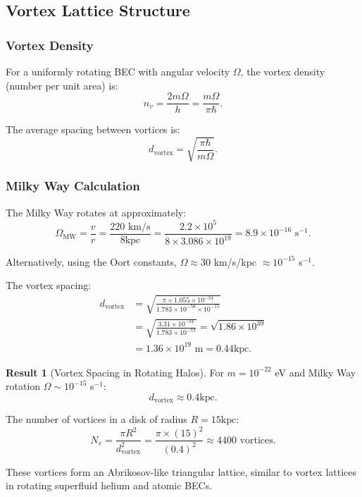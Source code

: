 \documentclass[11pt,a4paper]{article}
\newcommand{\kpc}{\ensuremath{\mathrm{kpc}}}
\theoremstyle{definition}
\newtheorem{result}{Result}[section]
\theoremstyle{remark}
\begin{document}
\subsection{Vortex Lattice Structure}
\label{sec:vortex_lattice}

\subsubsection{Vortex Density}

For a uniformly rotating BEC with angular velocity $\Omega$, the vortex density (number per unit area) is:
\begin{equation}
n_v = \frac{2m\Omega}{h} = \frac{m\Omega}{\pi\hbar}.
\end{equation}

The average spacing between vortices is:
\begin{equation}
\label{eq:vortex_spacing}
\boxed{d_{\mathrm{vortex}} = \sqrt{\frac{\pi\hbar}{m\Omega}}.}
\end{equation}

\subsubsection{Milky Way Calculation}

The Milky Way rotates at approximately:
\begin{equation}
\Omega_{\mathrm{MW}} = \frac{v}{r} = \frac{220 \text{ km/s}}{8 \kpc} = \frac{2.2 \times 10^5}{8 \times 3.086 \times 10^{19}} = 8.9 \times 10^{-16} \text{ s}^{-1}.
\end{equation}

Alternatively, using the Oort constants, $\Omega \approx 30$ km/s/kpc $\approx 10^{-15}$ s$^{-1}$.

The vortex spacing:
\begin{align}
d_{\mathrm{vortex}} &= \sqrt{\frac{\pi \times 1.055 \times 10^{-34}}{1.783 \times 10^{-58} \times 10^{-15}}} \\
&= \sqrt{\frac{3.31 \times 10^{-34}}{1.783 \times 10^{-73}}} = \sqrt{1.86 \times 10^{39}} \\
&= 1.36 \times 10^{19} \text{ m} = 0.44 \kpc.
\end{align}

\begin{result}[Vortex Spacing in Rotating Halos]
For $m = 10^{-22}$ eV and Milky Way rotation $\Omega \sim 10^{-15}$ s$^{-1}$:
\begin{equation}
\boxed{d_{\mathrm{vortex}} \approx 0.4 \kpc.}
\end{equation}

The number of vortices in a disk of radius $R = 15 \kpc$:
\begin{equation}
N_v = \frac{\pi R^2}{d_{\mathrm{vortex}}^2} = \frac{\pi \times (15)^2}{(0.4)^2} \approx 4400 \text{ vortices}.
\end{equation}

These vortices form an Abrikosov-like triangular lattice, similar to vortex lattices in rotating superfluid helium and atomic BECs.
\end{result}
\end{document}
